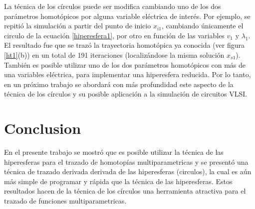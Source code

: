 \documentclass[conference,letterpaper,twocolumn]{IEEEtran}
\begin{document}
La técnica de los círculos puede ser modifica cambiando uno de los dos parámetros homotópicos
por alguna variable eléctrica de interés. Por ejemplo, se repitió la simulación a partir del punto de inicio $x_{i1}$, cambiando únicamente el circulo de la  ecuación \ref{hiperesfera1}, por otro en función de las variables $v_1$ y $\lambda_1$. El resultado fue que se trazó la trayectoria homotópica ya conocida (ver figura \ref{ht1}(b)) en un total de 191 iteraciones (localizándose la misma solución $x_{s1}$). También es posible utilizar uno de los dos parámetros homotópicos con más de una  variables eléctrica, para
implementar una hiperesfera reducida. Por lo tanto, en un próximo trabajo se abordará con más profundidad este aspecto
de la técnica de los círculos y su posible aplicación a la simulación de circuitos VLSI.




\section{Conclusion}
En el presente trabajo se mostró que es posible utilizar la técnica de las hiperesferas para el trazado de homotopías multiparametricas y se presentó una técnica de trazado derivada derivada de las hiperesferas (circulos), la cual es aún más simple de programar y rápida que la técnica de las hiperesferas. Estos
resultados hacen de la técnica de los círculos una herramienta atractiva para el trazado de funciones multiparametricas.




\end{document}
